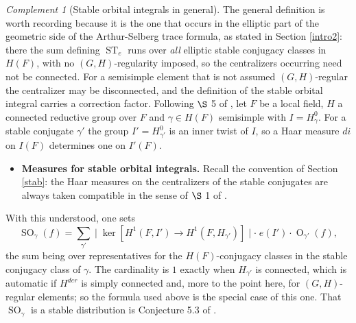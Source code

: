 \documentclass[11pt,a4paper]{article}
\theoremstyle{definition}
\theoremstyle{plain}
\theoremstyle{remark}
\newtheorem{Rc}[shared]{Complement}
\theoremstyle{plain}
\DeclareMathOperator{\ST}{ST}
\DeclareMathOperator{\Or}{O}
\DeclareMathOperator{\SO}{SO}
\begin{document}
\begin{Rc}[Stable orbital integrals in general]\label{SOgeneral}
    The general definition is worth recording because it is the one that occurs in the elliptic part of the geometric side of the Arthur-Selberg trace formula, as stated in Section \ref{intro2}: there the sum defining $\ST_e$ runs over \emph{all} elliptic stable conjugacy classes in $H(F)$, with no $(G,H)$-regularity imposed, so the centralizers occurring need not be connected. For a semisimple element that is not assumed $(G,H)$-regular the centralizer may be disconnected, and the definition of the stable orbital integral carries a correction factor. Following $\S$ 5 of \cite{MR858284}, let $F$ be a local field, $H$ a connected reductive group over $F$ and $\gamma \in H(F)$ semisimple with $I = H_{\gamma}^0$. For a stable conjugate $\gamma'$ the group $I' = H_{\gamma'}^0$ is an inner twist of $I$, so a Haar measure $di$ on $I(F)$ determines one on $I'(F)$.
    \begin{itemize}
        \item \textbf{Measures for stable orbital integrals.} Recall the convention of Section \ref{stab}: the Haar measures on the centralizers of the stable conjugates are always taken compatible in the sense of $\S$ 1 of \cite{MR942522}.
    \end{itemize}
    With this understood, one sets
    $$\SO_{\gamma}(f) = \sum_{\gamma'} \mid \ker[H^1(F, I') \xrightarrow[]{} H^1(F, H_{\gamma'})] \mid \cdot \; e(I') \cdot \Or_{\gamma'}(f),$$
    the sum being over representatives for the $H(F)$-conjugacy classes in the stable conjugacy class of $\gamma$. The cardinality is $1$ exactly when $H_{\gamma'}$ is connected, which is automatic if $H^{der}$ is simply connected and, more to the point here, for $(G,H)$-regular elements; so the formula used above is the special case of this one. That $\SO_{\gamma}$ is a stable distribution is Conjecture 5.3 of \cite{MR858284}.
\end{Rc}
\end{document}
